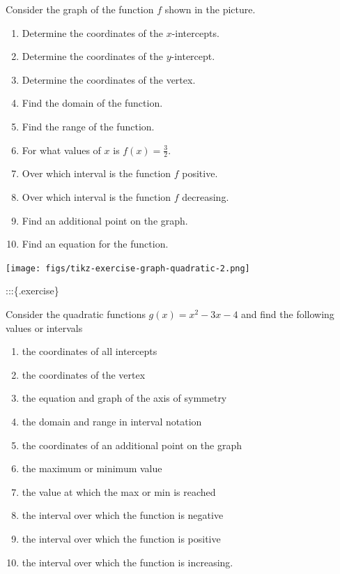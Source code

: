\documentclass[
  en,11pt]{elegantbook}
\providecommand{\tightlist}{%
  \setlength{\itemsep}{0pt}\setlength{\parskip}{0pt}}
\newcommand{\size}[2]{{\fontsize{#1}{0}\selectfont#2}}
\renewenvironment{exercise}[1][]{
    \refstepcounter{exer}
    \par\noindent
    \makebox[-3pt][r]{\color{red!90}\size{12}{\HandPencilLeft}}
	\textbf{\color{main}{\exercisename} \theexer #1}
    \rmfamily
}{\par\ignorespacesafterend}
\begin{document}
\begin{exercise}
Consider the graph of the function \(f\) shown in the picture.

\begin{enumerate}
\def\labelenumi{\arabic{enumi}.}
\tightlist
\item
  Determine the coordinates of the \(x\)-intercepts.
\item
  Determine the coordinates of the \(y\)-intercept.
\item
  Determine the coordinates of the vertex.
\item
  Find the domain of the function.
\item
  Find the range of the function.
\item
  For what values of \(x\) is \(f(x)=\frac{3}{2}\).
\item
  Over which interval is the function \(f\) positive.
\item
  Over which interval is the function \(f\) decreasing.
\item
  Find an additional point on the graph.
\item
  Find an equation for the function.
\end{enumerate}

\texttt{[image: figs/tikz-exercise-graph-quadratic-2.png]}\\

\end{exercise}

:::\{.exercise\}

Consider the quadratic functions \(g(x)=x^2-3x-4\) and find the following values or intervals

\begin{enumerate}
\def\labelenumi{\arabic{enumi}.}
\tightlist
\item
  the coordinates of all intercepts
\item
  the coordinates of the vertex
\item
  the equation and graph of the axis of symmetry
\item
  the domain and range in interval notation
\item
  the coordinates of an additional point on the graph
\item
  the maximum or minimum value
\item
  the value at which the max or min is reached
\item
  the interval over which the function is negative
\item
  the interval over which the function is positive
\item
  the interval over which the function is increasing.
\end{enumerate}
\end{document}
